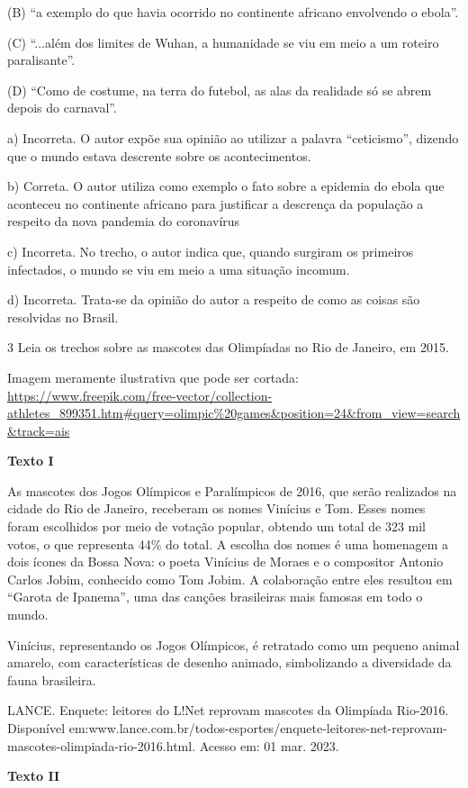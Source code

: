 \begin{itemize}
\begin{itemize}
{\begin{itemize}
\begin{itemize}
(B) ``a exemplo do que havia ocorrido no continente africano envolvendo
o ebola''.

(C) ``...além dos limites de Wuhan, a humanidade se viu em meio a um
roteiro paralisante''.

(D) ``Como de costume, na terra do futebol, as alas da realidade só se
abrem depois do carnaval''.

a) Incorreta. O autor expõe sua opinião ao utilizar a palavra
``ceticismo'', dizendo que o mundo estava descrente sobre os
acontecimentos.

b) Correta. O autor utiliza como exemplo o fato sobre a epidemia do
ebola que aconteceu no continente africano para justificar a descrença
da população a respeito da nova pandemia do coronavírus

c) Incorreta. No trecho, o autor indica que, quando surgiram os
primeiros infectados, o mundo se viu em meio a uma situação incomum.

d) Incorreta. Trata-se da opinião do autor a respeito de como as coisas
são resolvidas no Brasil.

\num{3} Leia os trechos sobre as mascotes das Olimpíadas no Rio de
Janeiro, em 2015.

Imagem meramente ilustrativa que pode ser cortada:
\url{https://www.freepik.com/free-vector/collection-athletes_899351.htm\#query=olimpic\%20games\&position=24\&from_view=search\&track=ais}

\textbf{Texto I}

As mascotes dos Jogos Olímpicos e Paralímpicos de 2016, que serão
realizados na cidade do Rio de Janeiro, receberam os nomes Vinícius e
Tom. Esses nomes foram escolhidos por meio de votação popular, obtendo
um total de 323 mil votos, o que representa 44\% do total. A escolha dos
nomes é uma homenagem a dois ícones da Bossa Nova: o poeta Vinícius de
Moraes e o compositor Antonio Carlos Jobim, conhecido como Tom Jobim. A
colaboração entre eles resultou em ``Garota de Ipanema'', uma das
canções brasileiras mais famosas em todo o mundo.

Vinícius, representando os Jogos Olímpicos, é retratado como um pequeno
animal amarelo, com características de desenho animado, simbolizando a
diversidade da fauna brasileira.

LANCE. Enquete: leitores do L!Net reprovam mascotes da Olimpíada
Rio-2016. Disponível
em:www.lance.com.br/todos-esportes/enquete-leitores-net-reprovam-mascotes-olimpiada-rio-2016.html.
Acesso em: 01 mar. 2023.

\textbf{Texto II}


\end{itemize}
\end{itemize}}
\end{itemize}
\end{itemize}
